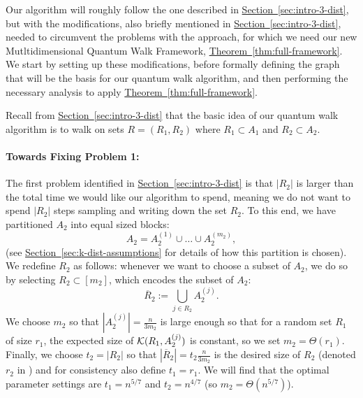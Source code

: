 \documentclass{theoretics}
\renewcommand{\sec}[1]{\hyperref[sec:#1]{Section~\ref*{sec:#1}}}
\newcommand{\thm}[1]{\hyperref[thm:#1]{Theorem~\ref*{thm:#1}}}
\renewcommand{\>}{\rangle}
\newcommand{\<}{\langle}
\renewcommand{\(}{\left(}
\renewcommand{\)}{\right)}
\begin{document}
Our algorithm will roughly follow the one described in \sec{intro-3-dist}, but with the modifications, also briefly mentioned in \sec{intro-3-dist}, needed to circumvent the problems with the approach, for which we need our new Mutltidimensional Quantum Walk Framework, \thm{full-framework}. We start by setting up these modifications, before formally defining the graph that will be the basis for our quantum walk algorithm, and then performing the necessary analysis to apply \thm{full-framework}.

\vskip10pt

Recall from \sec{intro-3-dist} that the basic idea of our quantum walk algorithm is to walk on sets $R = (R_1,R_2)$ where $R_1\subset A_1$ and $R_2\subset A_2$. 

\paragraph{Towards Fixing Problem 1:} The first problem identified in \sec{intro-3-dist} is that $|R_2|$ is larger than the total time we would like our algorithm to spend, meaning we do not want to spend $|R_2|$ steps sampling and writing down the set $R_2$. To this end, we have partitioned $A_2$ into equal sized blocks:
$$A_2=A_2^{(1)}\cup\dots\cup A_2^{(m_2)},$$
(see \sec{k-dist-assumptions} for details of how this partition is chosen). We redefine $R_2$ as follows: whenever we want to choose a subset of $A_2$, we do so by selecting $R_2\subset [m_2]$, which encodes the subset of $A_2$:
$$\overline{R}_2:=\bigcup_{j\in R_2} A_2^{(j)}.$$
We choose $m_2$ so that $|A_2^{(j)}|=\frac{n}{3m_2}$ is large enough so that for a random set $R_1$ of size $r_1$, the expected size of ${\cal K}({R}_1,A_2^{(j)})$ is constant, so we set $m_2=\Theta(r_1)$. Finally, we choose $t_2=|R_2|$ so that $|\overline{R}_2|=t_2\frac{n}{3m_2}$ is the desired size of $R_2$ (denoted $r_2$ in \cite{belovs2012kDist}) and for consistency also define $t_1 = r_1$. We will find that the optimal parameter settings are $t_1=n^{5/7}$ and $t_2=n^{4/7}$ (so $m_2=\Theta(n^{5/7})$). 
\end{document}

